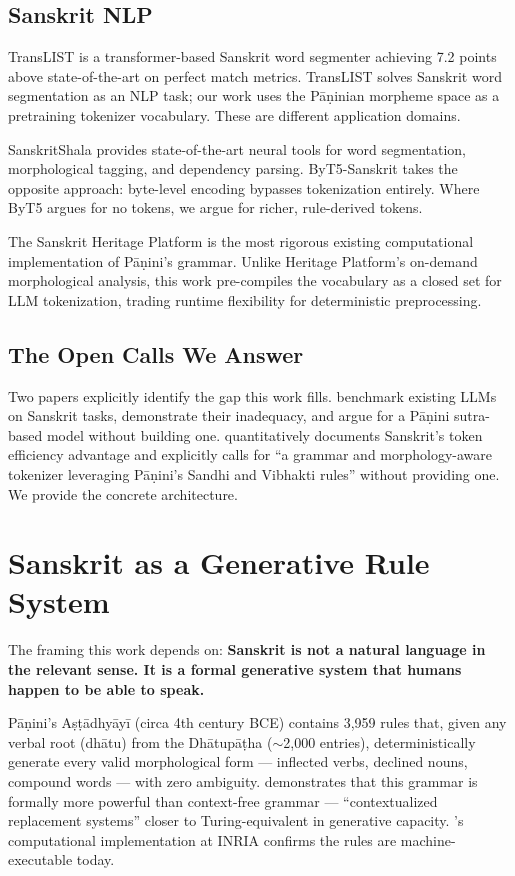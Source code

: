 \documentclass[11pt]{article}
\begin{document}
\subsection{Sanskrit NLP}

TransLIST \citep{sandhan2022} is a transformer-based Sanskrit word segmenter achieving 7.2 points above state-of-the-art on perfect match metrics. TransLIST solves Sanskrit word segmentation as an NLP task; our work uses the P\={a}\d{n}inian morpheme space as a pretraining tokenizer vocabulary. These are different application domains.

SanskritShala \citep{sandhan2023} provides state-of-the-art neural tools for word segmentation, morphological tagging, and dependency parsing. ByT5-Sanskrit \citep{byt5sanskrit2024} takes the opposite approach: byte-level encoding bypasses tokenization entirely. Where ByT5 argues for no tokens, we argue for richer, rule-derived tokens.

The Sanskrit Heritage Platform \citep{huet2008} is the most rigorous existing computational implementation of P\={a}\d{n}ini's grammar. Unlike Heritage Platform's on-demand morphological analysis, this work pre-compiles the vocabulary as a closed set for LLM tokenization, trading runtime flexibility for deterministic preprocessing.

\subsection{The Open Calls We Answer}

Two papers explicitly identify the gap this work fills. \citet{srikant2025} benchmark existing LLMs on Sanskrit tasks, demonstrate their inadequacy, and argue for a P\={a}\d{n}ini sutra-based model without building one. \citet{kumar2026} quantitatively documents Sanskrit's token efficiency advantage and explicitly calls for ``a grammar and morphology-aware tokenizer leveraging P\={a}\d{n}ini's Sandhi and Vibhakti rules'' without providing one. We provide the concrete architecture.

\section{Sanskrit as a Generative Rule System}

The framing this work depends on: \textbf{Sanskrit is not a natural language in the relevant sense. It is a formal generative system that humans happen to be able to speak.}

P\={a}\d{n}ini's A\d{s}\d{t}\={a}dhy\={a}y\={i} (circa 4th century BCE) contains 3,959 rules that, given any verbal root (dh\={a}tu) from the Dh\={a}tup\={a}\d{t}ha ($\sim$2,000 entries), deterministically generate every valid morphological form --- inflected verbs, declined nouns, compound words --- with zero ambiguity. \citet{kiparsky2009} demonstrates that this grammar is formally more powerful than context-free grammar --- ``contextualized replacement systems'' closer to Turing-equivalent in generative capacity. \citeauthor{huet2008}'s \citeyearpar{huet2008} computational implementation at INRIA confirms the rules are machine-executable today.
\end{document}
